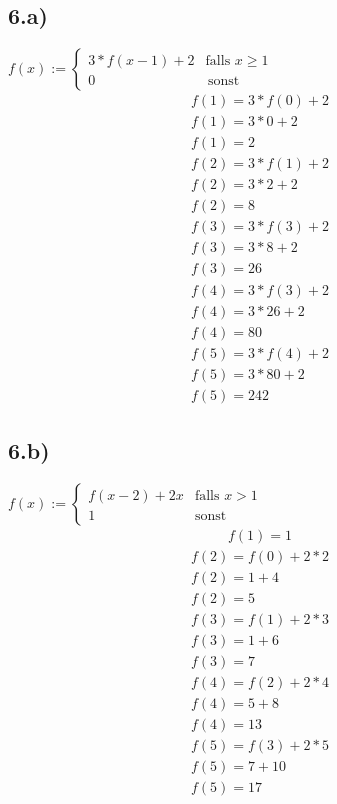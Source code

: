 \documentclass[10pt,ngerman]{scrartcl}
\begin{document}
\subsection{6.a)}
$f(x) := \begin{cases}
3 * f(x - 1) +2 & \text{falls } x \geq 1 \\
0 & \, \text{sonst}
\end{cases}$
\setcounter{equation}{0}
\begin{align}
f(1) = 3 * f(0) + 2\\
f(1) = 3 * 0 + 2\\
f(1) = 2
\end{align}
\begin{align}
f(2) = 3 * f(1) + 2\\
f(2) = 3 * 2 + 2\\
f(2) = 8
\end{align}
\begin{align}
f(3) = 3 * f(3) + 2\\
f(3) = 3 * 8 + 2\\
f(3) = 26
\end{align}
\begin{align}
f(4) = 3 * f(3) + 2\\
f(4) = 3 * 26 + 2\\
f(4) = 80
\end{align}
\begin{align}
f(5) = 3 * f(4) + 2\\
f(5) = 3 * 80 + 2\\
f(5) = 242
\end{align}
\subsection{6.b)}
$f(x) := \begin{cases}
f(x - 2) + 2x & \text{falls } x > 1\\
1 & \text{sonst}
\end{cases}$
\setcounter{equation}{0}
\begin{align}
f(1) = 1
\end{align}
\begin{align}
f(2) = f(0) + 2 * 2\\
f(2) = 1+4\\
f(2) = 5
\end{align}
\begin{align}
f(3) = f(1) + 2 * 3\\
f(3) = 1+6\\
f(3) = 7
\end{align}
\begin{align}
f(4) = f(2) + 2 * 4\\
f(4) = 5+8\\
f(4) = 13
\end{align}
\begin{align}
f(5) = f(3) + 2 * 5\\
f(5) = 7+10\\
f(5) = 17
\end{align}
\end{document}
